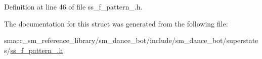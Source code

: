 Definition at line 46 of file ss\+\_\+f\+\_\+pattern\+\_.\+h.



The documentation for this struct was generated from the following file\+:\begin{DoxyCompactItemize}
\item 
smacc\+\_\+sm\+\_\+reference\+\_\+library/sm\+\_\+dance\+\_\+bot/include/sm\+\_\+dance\+\_\+bot/superstates/\hyperlink{include_2sm__dance__bot_2superstates_2ss__f__pattern__1_8h}{ss\+\_\+f\+\_\+pattern\+\_.\+h}\end{DoxyCompactItemize}
